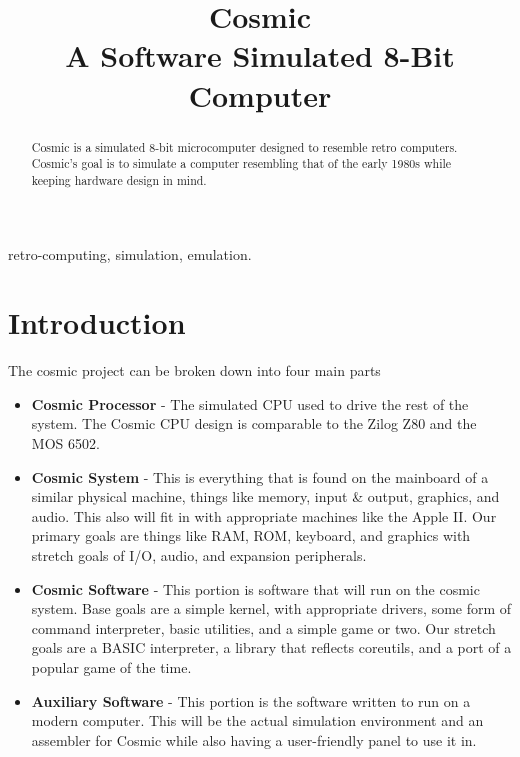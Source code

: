 \documentclass[conference]{IEEEtran}
\begin{document}
\title{
 Cosmic\\A Software Simulated 8-Bit Computer}

\author{
\and
{}

}

\maketitle

\begin{abstract}
Cosmic is a simulated 8-bit microcomputer designed to resemble retro computers. Cosmic's goal is to simulate a computer resembling that of the early 1980s while keeping hardware design in mind. 
\end{abstract}

\begin{IEEEkeywords}
retro-computing, simulation, emulation.
\end{IEEEkeywords}

\section{Introduction}
The cosmic project can be broken down into four main parts
\begin{itemize}
    \item \textbf{Cosmic Processor} - The simulated CPU used to drive the rest of the system. The Cosmic CPU design is comparable to the Zilog Z80 and the MOS 6502. 
    \item \textbf{Cosmic System} - This is everything that is found on the mainboard of a similar physical machine, things like memory, input \& output, graphics, and audio. This also will fit in with appropriate machines like the Apple II. Our primary goals are things like RAM, ROM, keyboard, and graphics with stretch goals of I/O, audio, and expansion peripherals. 
    \item \textbf{Cosmic Software}  - This portion is software that will run on the cosmic system. Base goals are a simple kernel, with appropriate drivers, some form of command interpreter, basic utilities, and a simple game or two. Our stretch goals are a BASIC interpreter, a library that reflects coreutils, and a port of a popular game of the time. 
    \item \textbf{Auxiliary Software} - This portion is the software written to run on a modern computer. This will be the actual simulation environment and an assembler for Cosmic while also having a user-friendly panel to use it in.
\end{itemize}
\end{document}
